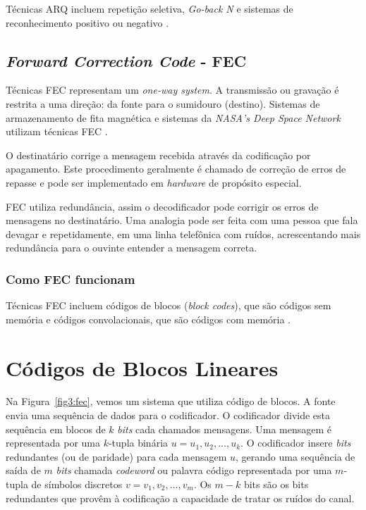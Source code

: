 Técnicas ARQ incluem repetição seletiva, \emph{Go-back N} e sistemas de reconhecimento positivo ou negativo \cite{Kurose:2010}.

\subsection{\emph{Forward Correction Code} - FEC}

Técnicas FEC representam um \emph{one-way system}. A transmissão ou gravação é restrita a uma direção: da fonte para o sumidouro (destino). Sistemas de armazenamento de fita magnética e sistemas da \emph{NASA's Deep Space Network} utilizam técnicas FEC \cite{Lin:1983}.

O destinatário corrige a mensagem recebida através da codificação por apagamento. Este procedimento geralmente é chamado de correção de erros de repasse e pode ser implementado em \emph{hardware} de propósito especial.

FEC utiliza redundância, assim o decodificador pode corrigir os erros de mensagens no destinatário. Uma analogia pode ser feita com uma pessoa que fala devagar e repetidamente, em uma linha telefônica com ruídos, acrescentando mais redundância para o ouvinte entender a mensagem correta.

\subsubsection{Como FEC funcionam}

Técnicas FEC incluem códigos de blocos (\emph{block codes}), que são códigos sem memória e códigos convolacionais, que são códigos com memória \cite{Berlekamp:1987}. 

\section{Códigos de Blocos Lineares}

Na Figura~\ref{fig3:fec}, vemos um sistema que utiliza código de
blocos. A fonte envia uma sequência de dados para o codificador. O
codificador divide esta sequência em blocos de $k$ \emph{bits}
cada chamados mensagens.  Uma mensagem é representada por uma
$k$-tupla binária $u = u_1, u_2,\dots, u_k$. O codificador insere
\emph{bits} redundantes (ou de paridade) para cada mensagem $u$,
gerando uma sequência de saída de $m$ \emph{bits} chamada
\emph{codeword} ou palavra código representada por uma $m$-tupla de
símbolos discretos $v = v_1, v_2, \dots, v_m$.  Os $m - k$ bits são os
bits redundantes que provêm à codificação a capacidade de tratar os
ruídos do canal.

